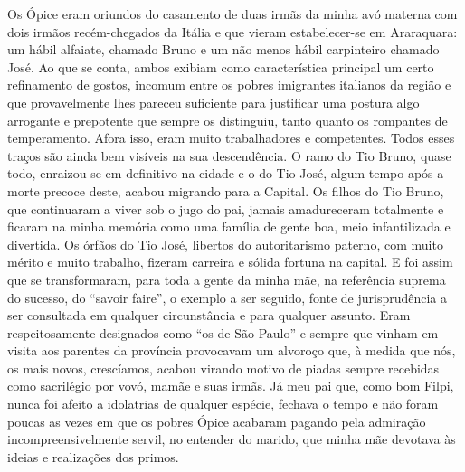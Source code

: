 Os Ópice eram oriundos do casamento de duas irmãs da minha avó materna com dois irmãos recém-chegados da Itália e que vieram estabelecer-se em Araraquara: um hábil alfaiate, chamado Bruno e um não menos hábil carpinteiro chamado José. 
Ao que se conta, ambos exibiam como característica principal um certo refinamento de gostos, incomum entre os pobres imigrantes italianos da região e que provavelmente lhes pareceu suficiente para justificar uma postura algo arrogante e prepotente que sempre os distinguiu, tanto quanto os rompantes de temperamento. 
Afora isso, eram muito trabalhadores e competentes. Todos esses traços são ainda bem visíveis na sua descendência. 
O ramo do Tio Bruno, quase todo, enraizou-se em definitivo na cidade e o do Tio José, algum tempo após a morte precoce deste, acabou migrando para a Capital. 
Os filhos do Tio Bruno, que continuaram a viver sob o jugo do pai, jamais amadureceram totalmente e ficaram na minha memória como uma família de gente boa, meio infantilizada e divertida. 
Os órfãos do Tio José, libertos do autoritarismo paterno, com muito mérito e muito trabalho, fizeram carreira e sólida fortuna na capital. 
E foi assim que se transformaram, para toda a gente da minha mãe, na referência suprema do sucesso, do ``savoir faire'', o exemplo a ser seguido, fonte de jurisprudência a ser consultada em qualquer circunstância e para qualquer assunto. 
Eram respeitosamente designados como ``os de São Paulo'' e sempre que vinham em visita aos parentes da província provocavam um alvoroço que, à medida que nós, os mais novos, crescíamos, acabou virando motivo de piadas sempre recebidas como sacrilégio por vovó, mamãe e suas irmãs. 
Já meu pai que, como bom Filpi, nunca foi afeito a idolatrias de qualquer espécie, fechava o tempo e não foram poucas as vezes em que os pobres Ópice acabaram pagando pela admiração incompreensivelmente servil, no entender do marido, que minha mãe devotava às ideias e realizações dos primos.